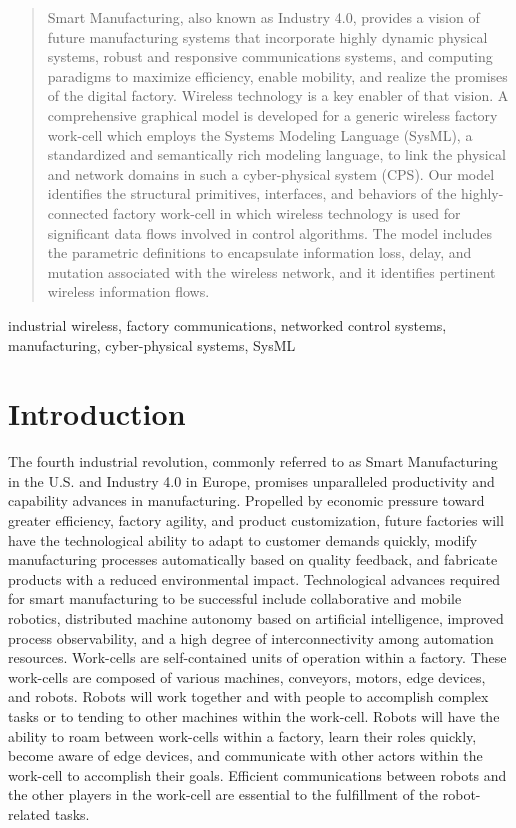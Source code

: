 \documentclass[journal, twoside]{IEEEtran}
\begin{document}
	\begin{abstract}
		Smart Manufacturing, also known as Industry 4.0, provides a vision of future manufacturing systems that incorporate highly dynamic physical systems, robust and responsive communications systems, and computing paradigms to maximize efficiency, enable mobility, and realize the promises of the digital factory.  Wireless technology is a key enabler of that vision. A comprehensive graphical model is developed for a generic wireless factory work-cell which employs the Systems Modeling Language (SysML), a standardized and semantically rich modeling language, to link the physical and network domains in such a cyber-physical system (CPS). Our model identifies the structural primitives, interfaces, and behaviors of the highly-connected factory work-cell in which wireless technology is used for significant data flows involved in control algorithms. The model includes the parametric definitions to encapsulate information loss, delay, and mutation associated with the wireless network, and it identifies pertinent wireless information flows.
		
	\end{abstract}
	
	\begin{IEEEkeywords}
		industrial wireless, factory communications, networked control systems, manufacturing, cyber-physical systems, SysML
		
	\end{IEEEkeywords}
	
	
	\IEEEpeerreviewmaketitle
	
	\section{Introduction} \label{sec:intro}    
	The fourth industrial revolution, commonly referred to as Smart Manufacturing in the U.S. and Industry 4.0 in Europe, promises unparalleled productivity and capability advances in manufacturing.  Propelled by economic pressure toward greater efficiency, factory agility, and product customization, future factories will have the technological ability to adapt to customer demands quickly, modify manufacturing processes automatically based on quality feedback, and fabricate products with a reduced environmental impact.  Technological advances required for smart manufacturing to be successful include collaborative and mobile robotics, distributed machine autonomy based on artificial intelligence, improved process observability, and a high degree of interconnectivity among automation resources. Work-cells are self-contained units of operation within a factory.  These work-cells are composed of various machines, conveyors, motors, edge devices, and robots.  Robots will work together and with people to accomplish complex tasks or to tending to other machines within the work-cell.  Robots will have the ability to roam between work-cells within a factory, learn their roles quickly, become aware of edge devices, and communicate with other actors within the work-cell to accomplish their goals. Efficient communications between robots and the other players in the work-cell are essential to the fulfillment of the robot-related tasks.
	
\end{document}
